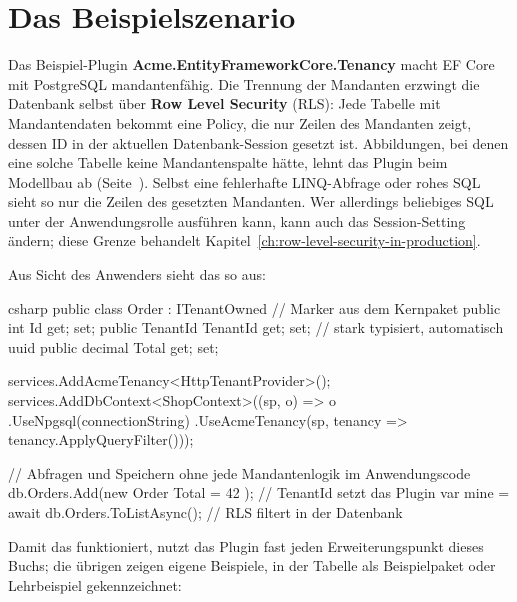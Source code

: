 \chapter{Das Beispielszenario}\label{ch:the-sample-scenario}

Das Beispiel-Plugin \textbf{Acme.EntityFrameworkCore.Tenancy} macht EF Core mit PostgreSQL
mandantenfähig. Die Trennung der Mandanten erzwingt die Datenbank selbst über \textbf{Row
Level Security} (RLS): Jede Tabelle mit Mandantendaten bekommt eine Policy, die nur Zeilen des
Mandanten zeigt, dessen ID in der aktuellen Datenbank-Session gesetzt ist. Abbildungen, bei
denen eine solche Tabelle keine Mandantenspalte hätte, lehnt das Plugin beim Modellbau ab
(Seite~\pageref{sec:supported-table-mappings}). Selbst eine fehlerhafte LINQ-Abfrage oder
rohes SQL sieht so nur die Zeilen des gesetzten Mandanten. Wer allerdings beliebiges SQL unter
der Anwendungsrolle ausführen kann, kann auch das Session-Setting ändern; diese Grenze
behandelt Kapitel~\ref{ch:row-level-security-in-production}.

Aus Sicht des Anwenders sieht das so aus:

\begin{sourcecode}[Anwendersicht]{csharp}
public class Order : ITenantOwned               // Marker aus dem Kernpaket
{
    public int Id { get; set; }
    public TenantId TenantId { get; set; }      // stark typisiert, automatisch uuid
    public decimal Total { get; set; }
}

services.AddAcmeTenancy<HttpTenantProvider>();
services.AddDbContext<ShopContext>((sp, o) => o
    .UseNpgsql(connectionString)
    .UseAcmeTenancy(sp, tenancy => tenancy.ApplyQueryFilter()));

// Abfragen und Speichern ohne jede Mandantenlogik im Anwendungscode
db.Orders.Add(new Order { Total = 42 });         // TenantId setzt das Plugin
var mine = await db.Orders.ToListAsync();        // RLS filtert in der Datenbank
\end{sourcecode}

Damit das funktioniert, nutzt das Plugin fast jeden Erweiterungspunkt dieses Buchs; die übrigen
zeigen eigene Beispiele, in der Tabelle als Beispielpaket oder Lehrbeispiel gekennzeichnet:

